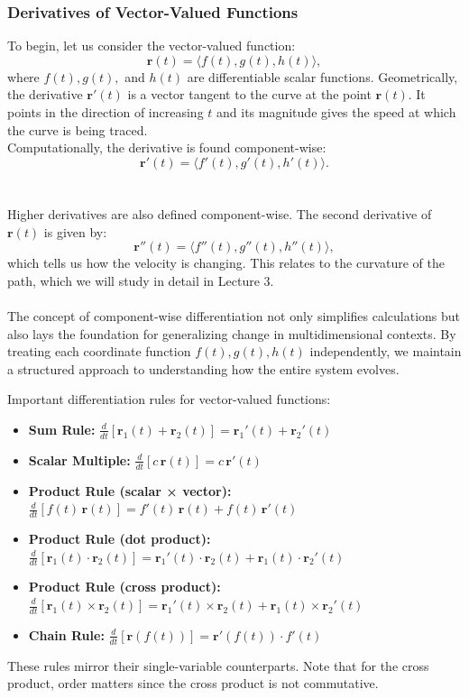 \subsubsection*{Derivatives of Vector-Valued Functions}

\noindent To begin, let us consider the vector-valued function:
\[
\mathbf{r}(t) = \langle f(t), g(t), h(t) \rangle,
\]
where \( f(t), g(t), \) and \( h(t) \) are differentiable scalar functions. Geometrically, the derivative \( \mathbf{r}'(t) \) is a vector tangent to the curve at the point \( \mathbf{r}(t) \). It points in the direction of increasing \( t \) and its magnitude gives the speed at which the curve is being traced. \ \\
Computationally, the derivative is found component-wise:
\[
\mathbf{r}'(t) = \langle f'(t), g'(t), h'(t) \rangle.
\] \\ \\ Higher derivatives are also defined component-wise. The second derivative of \( \mathbf{r}(t) \) is given by:
\[
\mathbf{r}''(t) = \langle f''(t), g''(t), h''(t) \rangle,
\]
which tells us how the velocity is changing. This relates to the curvature of the path, which we will study in detail in Lecture 3. \\ \\ The concept of component-wise differentiation not only simplifies calculations but also lays the foundation for generalizing change in multidimensional contexts. By treating each coordinate function \( f(t), g(t), h(t) \) independently, we maintain a structured approach to understanding how the entire system evolves. \ \

\noindent Important differentiation rules for vector-valued functions:
\begin{itemize}
\item \textbf{Sum Rule:} \( \frac{d}{dt}[\mathbf{r}_1(t) + \mathbf{r}_2(t)] = \mathbf{r}_1'(t) + \mathbf{r}_2'(t) \)
\item \textbf{Scalar Multiple:} \( \frac{d}{dt}[c \, \mathbf{r}(t)] = c \, \mathbf{r}'(t) \)
\item \textbf{Product Rule (scalar × vector):} \( \frac{d}{dt}[f(t) \, \mathbf{r}(t)] = f'(t) \, \mathbf{r}(t) + f(t) \, \mathbf{r}'(t) \)
\item \textbf{Product Rule (dot product):} \( \frac{d}{dt}[\mathbf{r}_1(t) \cdot \mathbf{r}_2(t)] = \mathbf{r}_1'(t) \cdot \mathbf{r}_2(t) + \mathbf{r}_1(t) \cdot \mathbf{r}_2'(t) \)
\item \textbf{Product Rule (cross product):} \( \frac{d}{dt}[\mathbf{r}_1(t) \times \mathbf{r}_2(t)] = \mathbf{r}_1'(t) \times \mathbf{r}_2(t) + \mathbf{r}_1(t) \times \mathbf{r}_2'(t) \)
\item \textbf{Chain Rule:} \( \frac{d}{dt}[\mathbf{r}(f(t))] = \mathbf{r}'(f(t)) \cdot f'(t) \)
\end{itemize}
\noindent These rules mirror their single-variable counterparts. Note that for the cross product, order matters since the cross product is not commutative.\ \

